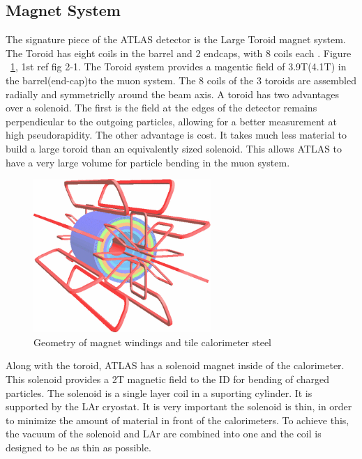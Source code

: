 \subsection{Magnet System}\label{ssec:mag}
The signature piece of the ATLAS detector is the Large Toroid magnet system. The Toroid has eight coils in the barrel and 2 endcaps, with 8 coils each \cite{CERN-LHCC-97-018}. Figure ~\ref{fig:toroid}, 1st ref fig 2-1. The Toroid system provides a magentic field of 3.9T(4.1T) in the barrel(end-cap)to the muon system. The 8 coils of the 3 toroids are assembled radially and symmetriclly around the beam axis. A toroid has two advantages over a solenoid. The first is the field at the edges of the detector remains perpendicular to the outgoing particles, allowing for a better measurement at high pseudorapidity. The other advantage is cost. It takes much less material to build a large toroid than an equivalently sized solenoid. This allows ATLAS to have a very large volume for particle bending in the muon system.\linebreak

\begin{figure}[h]
\begin{center}
\includegraphics*[width=0.60\textwidth] {figures/toroid}%
\caption[Geometry of magnet windings and tile calorimeter steel]{Geometry of magnet windings and tile calorimeter steel \cite{Love:2011qua}}
\label{fig:toroid}
\end{center}
\end{figure}

\indent Along with the toroid, ATLAS has a solenoid magnet inside of the calorimeter. This solenoid  provides a 2T magnetic field to the ID for bending of charged particles. The solenoid is a single layer coil in a suporting cylinder. It is supported by the LAr cryostat. It is very important the solenoid is thin, in order to minimize the amount of material in front of the calorimeters. To achieve this, the vacuum of the solenoid and LAr are combined into one and the coil is designed to be as thin as possible.
